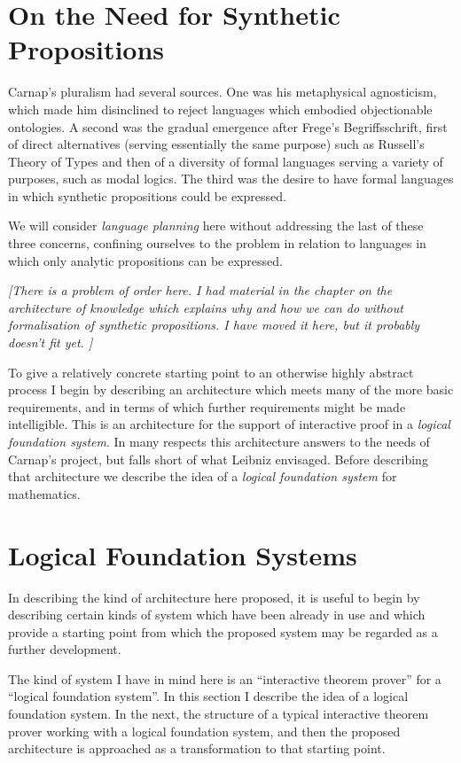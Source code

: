 \section{On the Need for Synthetic Propositions}

Carnap's pluralism had several sources.
One was his metaphysical agnosticism, which made him disinclined to
reject languages which embodied objectionable ontologies.
A second was the gradual emergence after Frege's Begriffsschrift,
first of direct alternatives (serving essentially the same purpose)
such as Russell's Theory of Types and then of a diversity of formal
languages serving a variety of purposes, such as modal logics.
The third was the desire to have formal languages in which synthetic
propositions could be expressed.

We will consider \emph{language planning} here without addressing the
last of these three concerns, confining ourselves to the problem in
relation to languages in which only analytic propositions can be
expressed.

{\it
[There is a problem of order here.
I had material in the chapter on the architecture of
knowledge which explains why and how we can do without formalisation
of synthetic propositions.
I have moved it here, but it probably doesn't fit yet.
]
}%


To give a relatively concrete starting point to an otherwise highly
abstract process I begin by describing an architecture which meets
many of the more basic requirements, and in terms of which further
requirements might be made intelligible. 
This is an architecture for the support of interactive proof in a
\emph{logical foundation system}. 
In many respects this architecture answers to the needs of Carnap's
project, but falls short of what Leibniz envisaged. 
Before describing that architecture we describe the idea of a
\emph{logical foundation system} for mathematics.

\section{Logical Foundation Systems}

In describing the kind of architecture here proposed, it is useful to
begin by describing certain kinds of system which have been already in
use and which provide a starting point from which the proposed system
may be regarded as a further development.

The kind of system I have in mind here is an ``interactive theorem
prover'' for a ``logical foundation system''.
In this section I describe the idea of a logical foundation system.
In the next, the structure of a typical interactive theorem prover
working with a logical foundation system, and then the proposed
architecture is approached as a transformation to that starting point.

